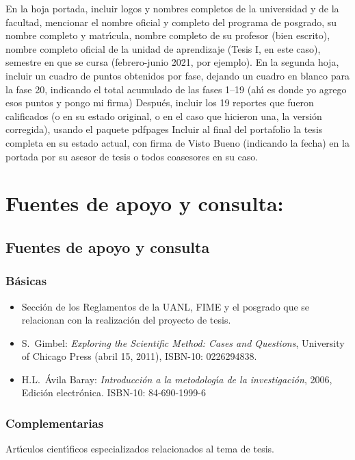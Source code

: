 \documentclass[10 pt]{article}
\begin{document}
En la hoja portada, incluir logos y nombres completos de la
universidad y de la facultad, mencionar el nombre oficial y completo
del programa de posgrado, su nombre completo y matr\'{\i}cula, nombre
completo de su profesor (bien escrito), nombre completo oficial de la
unidad de aprendizaje (Tesis I, en este caso), semestre en que se
cursa (febrero-junio 2021, por ejemplo). En la segunda hoja, incluir
un cuadro de puntos obtenidos por fase, dejando un cuadro en blanco
para la fase 20, indicando el total acumulado de las fases 1--19 (ah\'{\i}
es donde yo agrego esos puntos y pongo mi firma) Despu\'{e}s, incluir los
19 reportes que fueron calificados (o en su estado original, o en el
caso que hicieron una, la versi\'{o}n corregida), usando el paquete
pdfpages Incluir al final del portafolio la tesis completa en su
estado actual, con firma de Visto Bueno (indicando la fecha) en la
portada por su asesor de tesis o todos coasesores en su caso.

\section{Fuentes de apoyo y consulta:}
\subsection{Fuentes de apoyo y consulta}
\subsubsection{B\'{a}sicas}

\begin{itemize}[itemsep=0em]
  
\item{Secci\'{o}n de los Reglamentos de la UANL, FIME y el posgrado que se relacionan con la realizaci\'{o}n del proyecto de tesis.}
  
\item{S.\ {\sc Gimbel}: {\em Exploring the Scientific Method:
      Cases and Questions}, University of Chicago Press (abril 15,
    2011), ISBN-10: 0226294838.}
  
\item{ H.L.\ {\sc \'{A}vila Baray}: {\em Introducci\'{o}n a la
      metodolog\'{\i}a de la investigaci\'{o}n}, 2006, Edici\'{o}n electr\'{o}nica. ISBN-10: 84-690-1999-6}
  
\end{itemize}

\subsubsection{Complementarias}

Art\'{\i}culos cient\'{\i}ficos especializados relacionados al tema de tesis.

\label{final} %


\end{document}
